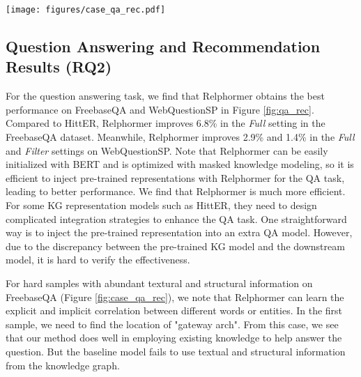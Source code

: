 \documentclass[sigconf]{acmart}
\newcommand{\bizhen}[1]{{\color{black}#1}}
\begin{document}
\begin{figure*}
    \centering
    \texttt{[image: figures/case\_qa\_rec.pdf]}
    \caption{Case study of KG-based tasks.
    Left: Case of QA task on {FreebaseQA}.
    Right: Case of Recommendation task on Movielens.
    }
    \label{fig:case_qa_rec}
\end{figure*}

\subsection{Question Answering and Recommendation Results (RQ2)}

For the question answering task, we find that Relphormer obtains the best performance on FreebaseQA and WebQuestionSP in Figure \ref{fig:qa_rec}.
Compared to HittER, Relphormer improves 6.8\% in the \textit{Full} setting in the FreebaseQA dataset. 
Meanwhile, Relphormer improves 2.9\% and 1.4\% in the 
\textit{Full}  and \textit{Filter} settings on WebQuestionSP.
Note that Relphormer can be easily initialized with BERT and is optimized with masked knowledge modeling, so it is efficient to inject \bizhen{pre-trained representations} with Relphormer for the QA task, leading to better performance.
We find that Relphormer is much more efficient.
For some KG representation models such as HittER, they need to design complicated integration strategies to enhance the QA task.
One straightforward way is to inject the pre-trained representation into an extra QA model. 
However, due to the discrepancy between the pre-trained KG model and the downstream model, it is hard to verify the effectiveness.

For hard samples with abundant textural and structural information on FreebaseQA (Figure \ref{fig:case_qa_rec}), we note that Relphormer can learn the explicit and implicit correlation between different words or entities.
In the first sample, we need to find the location of "gateway arch".
From this case, we see that our method does well in employing existing knowledge to help answer the question.
But the baseline model fails to use textual and structural information from the knowledge graph.
\end{document}
